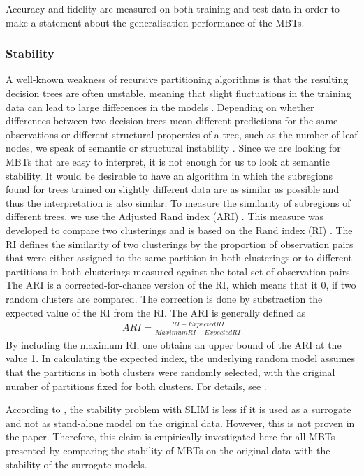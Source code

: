 Accuracy and fidelity are measured on both training and test data in order to make a statement about the generalisation performance of the MBTs.

\vspace{0.5cm}

\subsubsection{Stability}
A well-known weakness of recursive partitioning algorithms is that the resulting decision trees are often unstable, meaning that slight fluctuations in the training data can lead to large differences in the models \citep{Fokkema.2020}.
Depending on whether differences between two decision trees mean different predictions for the same observations or different structural properties of a tree, such as the number of leaf nodes, we speak of semantic or structural instability \citep{Wang.2018}. 
Since we are looking for MBTs that are easy to interpret, it is not enough for us to look at semantic stability. It would be desirable to have an algorithm in which the subregions found for trees trained on slightly different data are as similar as possible and thus the interpretation is also similar.
To measure the similarity of subregions of different trees, we use the Adjusted Rand index (ARI) \citep{Hubert.1985}.
This measure was developed to compare two clusterings and is based on the Rand index (RI) \citep{Rand.1971}. The RI defines the similarity of two clusterings by the proportion of observation pairs that were either assigned to the same partition in both clusterings or to different partitions in both clusterings measured against the total set of observation pairs. The ARI is a corrected-for-chance version of the RI, which means that it $0$, if two random clusters are compared. The correction is done by substraction the expected value of the RI from the RI. The ARI is generally defined as
\begin{align}
    ARI = \frac{RI - Expected RI}{Maximum RI - Expected RI}
\end{align}
By including the maximum RI, one obtains an upper bound of the ARI at the value 1.
In calculating the expected index, the underlying random model assumes that the partitions in both clusters were randomly selected, with the original number of partitions fixed for both clusters. 
For details, see \citep{Hubert.1985}.




According to \citep{Hu.2020}, the stability problem with SLIM is less if it is used as a surrogate and not as stand-alone model on the original data. However, this is not proven in the paper. Therefore, this claim is empirically investigated here for all MBTs presented by comparing the stability of MBTs on the original data with the stability of the surrogate models.



